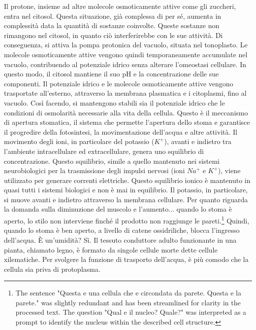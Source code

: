 \documentclass[11pt, a4paper]{article}
\begin{document}
\begin{spacing}{1.15}
Il protone, insieme ad altre molecole osmoticamente attive come gli zuccheri, entra nel citosol. Questa situazione, già complessa di per sé, aumenta in complessità data la quantità di sostanze coinvolte. Queste sostanze non rimangono nel citosol, in quanto ciò interferirebbe con le sue attività. Di conseguenza, si attiva la pompa protonica del vacuolo, situata nel tonoplasto. Le molecole osmoticamente attive vengono quindi temporaneamente accumulate nel vacuolo, contribuendo al potenziale idrico senza alterare l'omeostasi cellulare. In questo modo, il citosol mantiene il suo pH e la concentrazione delle sue componenti. Il potenziale idrico e le molecole osmoticamente attive vengono trasportate all'esterno, attraverso la membrana plasmatica e i citoplasmi, fino al vacuolo.  Così facendo, si mantengono stabili sia il potenziale idrico che le condizioni di osmolarità necessarie alla vita della cellula.
Questo è il meccanismo di apertura stomatica, il sistema che permette l'apertura dello stoma e garantisce il progredire della fotosintesi, la movimentazione dell'acqua e altre attività. Il movimento degli ioni, in particolare del potassio ($K^+$), avanti e indietro tra l'ambiente intracellulare ed extracellulare, genera uno squilibrio di concentrazione. Questo squilibrio, simile a quello mantenuto nei sistemi neurobiologici per la trasmissione degli impulsi nervosi (ioni $Na^+$ e $K^+$), viene utilizzato per generare correnti elettriche.  Questo squilibrio ionico è mantenuto in quasi tutti i sistemi biologici e non è mai in equilibrio. Il potassio, in particolare, si muove avanti e indietro attraverso la membrana cellulare. Per quanto riguarda la domanda sulla diminuzione del muscolo e l'aumento... quando lo stoma è aperto, lo stilo non interviene finché il prodotto non raggiunge le pareti.\footnote{The sentence "Questa e una cellula che e circondata da parete. Questa e la parete." was slightly redundant and has been streamlined for clarity in the processed text.  The question "Qual e il nucleo? Quale?" was interpreted as a prompt to identify the nucleus within the described cell structure.}
Quindi, quando lo stoma è ben aperto, a livello di catene ossidriliche, blocca l'ingresso dell'acqua. È un'umidità? Sì. Il tessuto conduttore adulto funzionante in una pianta, chiamato legno, è formato da singole cellule morte dette cellule xilematiche. Per svolgere la funzione di trasporto dell'acqua, è più comodo che la cellula sia priva di protoplasma.

\end{spacing}
\end{document}
